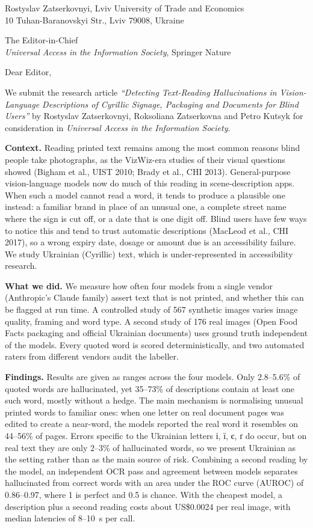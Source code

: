 \documentclass[11pt,a4paper]{article}
\begin{document}
\begin{flushright}
Rostyslav Zatserkovnyi, Lviv University of Trade and Economics\\
10 Tuhan-Baranovskyi Str., Lviv 79008, Ukraine
\end{flushright}

The Editor-in-Chief\\
\emph{Universal Access in the Information Society}, Springer Nature

Dear Editor,

We submit the research article \emph{``Detecting Text-Reading Hallucinations in Vision-Language Descriptions of Cyrillic Signage, Packaging and Documents for Blind Users''} by Rostyslav Zatserkovnyi, Roksoliana Zatserkovna and Petro Kutsyk for consideration in \emph{Universal Access in the Information Society}.

\textbf{Context.} Reading printed text remains among the most common reasons blind people take photographs, as the VizWiz-era studies of their visual questions showed (Bigham et al., UIST 2010; Brady et al., CHI 2013). General-purpose vision-language models now do much of this reading in scene-description apps. When such a model cannot read a word, it tends to produce a plausible one instead: a familiar brand in place of an unusual one, a complete street name where the sign is cut off, or a date that is one digit off. Blind users have few ways to notice this and tend to trust automatic descriptions (MacLeod et al., CHI 2017), so a wrong expiry date, dosage or amount due is an accessibility failure. We study Ukrainian (Cyrillic) text, which is under-represented in accessibility research.

\textbf{What we did.} We measure how often four models from a single vendor (Anthropic's Claude family) assert text that is not printed, and whether this can be flagged at run time. A controlled study of 567 synthetic images varies image quality, framing and word type. A second study of 176 real images (Open Food Facts packaging and official Ukrainian documents) uses ground truth independent of the models. Every quoted word is scored deterministically, and two automated raters from different vendors audit the labeller.

\textbf{Findings.} Results are given as ranges across the four models. Only 2.8--5.6\% of quoted words are hallucinated, yet 35--73\% of descriptions contain at least one such word, mostly without a hedge. The main mechanism is normalising unusual printed words to familiar ones: when one letter on real document pages was edited to create a near-word, the models reported the real word it resembles on 44--56\% of pages. Errors specific to the Ukrainian letters і, ї, є, ґ do occur, but on real text they are only 2--3\% of hallucinated words, so we present Ukrainian as the setting rather than as the main source of risk. Combining a second reading by the model, an independent OCR pass and agreement between models separates hallucinated from correct words with an area under the ROC curve (AUROC) of 0.86--0.97, where 1 is perfect and 0.5 is chance. With the cheapest model, a description plus a second reading costs about US\$0.0024 per real image, with median latencies of 8--10~s per call.
\end{document}

